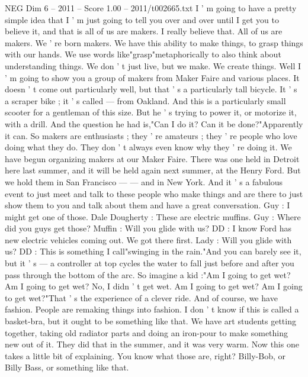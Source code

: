 \begin{textsample}{NEG Dim 6 – 2011 – Score 1.00 – 2011/t002665.txt}  \label{ex:f6_neg_046}
I ' m going to have a pretty simple idea that I ' m just going to tell you over and over until I get you to believe it, and that is all of us are makers.
I really believe that.
All of us are makers.
We ' re born makers.
We have this ability to make things, to grasp things with our hands.
We use words like"grasp"metaphorically to also think about understanding things.
We don ' t just live, but we make.
We create things.
Well I ' m going to show you a group of makers from Maker Faire and various places.
It doesn ' t come out particularly well, but that ' s a particularly tall bicycle.
It ' s a scraper bike ; it ' s called — from Oakland.
And this is a particularly small scooter for a gentleman of this size.
But he ' s trying to power it, or motorize it, with a drill.
And the question he had is,"Can I do it?
Can it be done?"Apparently it can.
So makers are enthusiasts ; they ' re amateurs ; they ' re people who love doing what they do.
They don ' t always even know why they ' re doing it.
We have begun organizing makers at our Maker Faire.
There was one held in Detroit here last summer, and it will be held again next summer, at the Henry Ford.
But we hold them in San Francisco — — and in New York.
And it ' s a fabulous event to just meet and talk to these people who make things and are there to just show them to you and talk about them and have a great conversation.
Guy : I might get one of those.
Dale Dougherty : These are electric muffins.
Guy : Where did you guys get those?
Muffin : Will you glide with us?
DD : I know Ford has new electric vehicles coming out.
We got there first.
Lady : Will you glide with us?
DD : This is something I call"swinging in the rain."And you can barely see it, but it ' s — a controller at top cycles the water to fall just before and after you pass through the bottom of the arc.
So imagine a kid :"Am I going to get wet?
Am I going to get wet?
No, I didn ' t get wet.
Am I going to get wet?
Am I going to get wet?"That ' s the experience of a clever ride.
And of course, we have fashion.
People are remaking things into fashion.
I don ' t know if this is called a basket-bra, but it ought to be something like that.
We have art students getting together, taking old radiator parts and doing an iron-pour to make something new out of it.
They did that in the summer, and it was very warm.
Now this one takes a little bit of explaining.
You know what those are, right?
Billy-Bob, or Billy Bass, or something like that.

\end{textsample}
